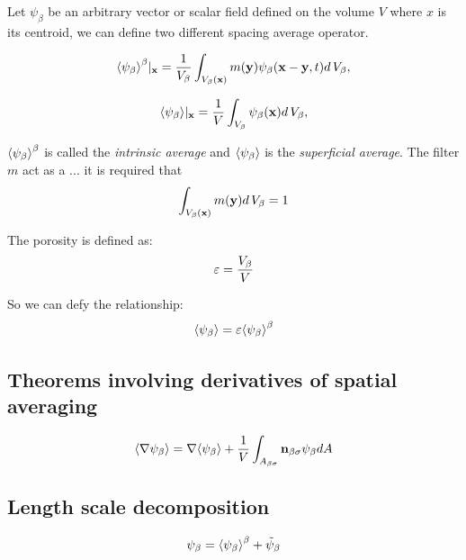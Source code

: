 Let $\psi_{\beta}$ be an arbitrary vector or scalar field defined on the volume $V$ where $x$ is its centroid, we can define two different spacing average operator.

\begin{equation}
{\left< \psi_{\beta} \right>}^{\beta}|_{\mathbf{x}} = \dfrac{1}{V_\beta} \int_{V_\beta(\mathbf{x})}  m(\mathbf{y}) \psi_{\beta}(\mathbf{x}-\mathbf{y}, t) d \, V_\beta,
\label{eq:avg_intrinsic}
\end{equation}

\begin{equation}
{\left< \psi_{\beta} \right>}|_{\mathbf{x}} = \dfrac{1}{V} \int_{V_\beta} \psi_\beta (\mathbf{x}) d \, V_\beta,
\label{eq:avg_superficial}
\end{equation}

${\left< \psi_{\beta} \right>}^{\beta}$ is called the \textit{intrinsic average} and ${\left< \psi_{\beta} \right>}$ is the \textit{superficial average}.
The filter $m$ act as a ...
 it is required that
$$
\int_{V_\beta(\mathbf{x})}  m(\mathbf{y}) d \, V_\beta = 1
$$

The porosity is defined as:
\begin{equation}
	\varepsilon = \dfrac{V_\beta}{V}
	\label{eq:porosity}
\end{equation}

So we can defy the relationship:
\begin{equation}
	{\left< \psi_{\beta} \right>} =  \varepsilon {\left< \psi_{\beta} \right>}^{\beta}
\end{equation}

\subsection{Theorems involving derivatives of spatial averaging}

\begin{theorem}
\[	{\left< \nabla \psi_{\beta} \right>} = \nabla {\left< \psi_{\beta} \right>} + \dfrac{1}{V}\int_{A_{\beta \sigma}} \mathbf{n}_{\beta \sigma} \psi_{\beta} dA \]
\end{theorem}


\subsection{Length scale decomposition}

\begin{equation}
	\psi_{\beta} = {\left< \psi_{\beta} \right>}^{\beta} + \tilde{\psi}_{\beta}
 \end{equation}


